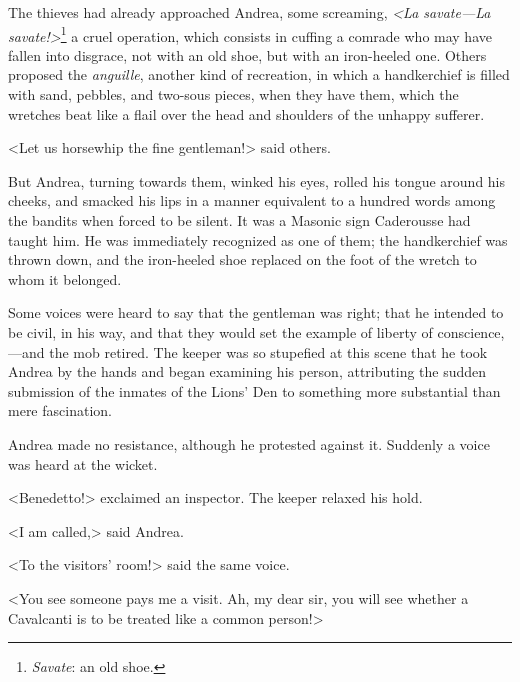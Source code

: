  The thieves had already approached Andrea, some screaming, \textit{<La savate—La savate!>}\footnote{\textit{Savate}: an old shoe. } a cruel operation, which consists in cuffing a comrade who may have fallen into disgrace, not with an old shoe, but with an iron-heeled one. Others proposed the \textit{anguille}, another kind of recreation, in which a handkerchief is filled with sand, pebbles, and two-sous pieces, when they have them, which the wretches beat like a flail over the head and shoulders of the unhappy sufferer. 

 <Let us horsewhip the fine gentleman!> said others. 

 But Andrea, turning towards them, winked his eyes, rolled his tongue around his cheeks, and smacked his lips in a manner equivalent to a hundred words among the bandits when forced to be silent. It was a Masonic sign Caderousse had taught him. He was immediately recognized as one of them; the handkerchief was thrown down, and the iron-heeled shoe replaced on the foot of the wretch to whom it belonged. 

 Some voices were heard to say that the gentleman was right; that he intended to be civil, in his way, and that they would set the example of liberty of conscience,—and the mob retired. The keeper was so stupefied at this scene that he took Andrea by the hands and began examining his person, attributing the sudden submission of the inmates of the Lions' Den to something more substantial than mere fascination. 

 Andrea made no resistance, although he protested against it. Suddenly a voice was heard at the wicket. 

 <Benedetto!> exclaimed an inspector. The keeper relaxed his hold. 

 <I am called,> said Andrea. 

 <To the visitors' room!> said the same voice. 

 <You see someone pays me a visit. Ah, my dear sir, you will see whether a Cavalcanti is to be treated like a common person!> 

